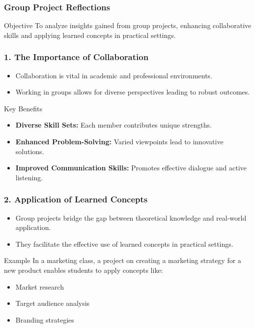 \documentclass[aspectratio=169]{beamer}
\begin{document}
\begin{frame}[fragile]
  \frametitle{Group Project Reflections}
  \begin{block}{Objective}
    To analyze insights gained from group projects, enhancing collaborative skills and applying learned concepts in practical settings.
  \end{block}
\end{frame}

\begin{frame}[fragile]
  \frametitle{1. The Importance of Collaboration}
  \begin{itemize}
    \item Collaboration is vital in academic and professional environments.
    \item Working in groups allows for diverse perspectives leading to robust outcomes.
  \end{itemize}
  
  \begin{block}{Key Benefits}
    \begin{itemize}
      \item \textbf{Diverse Skill Sets:} Each member contributes unique strengths.
      \item \textbf{Enhanced Problem-Solving:} Varied viewpoints lead to innovative solutions.
      \item \textbf{Improved Communication Skills:} Promotes effective dialogue and active listening.
    \end{itemize}
  \end{block}
\end{frame}

\begin{frame}[fragile]
  \frametitle{2. Application of Learned Concepts}
  \begin{itemize}
    \item Group projects bridge the gap between theoretical knowledge and real-world application.
    \item They facilitate the effective use of learned concepts in practical settings.
  \end{itemize}

  \begin{block}{Example}
    In a marketing class, a project on creating a marketing strategy for a new product enables students to apply concepts like:
    \begin{itemize}
      \item Market research
      \item Target audience analysis
      \item Branding strategies
    \end{itemize}
  \end{block}
\end{frame}
\end{document}
